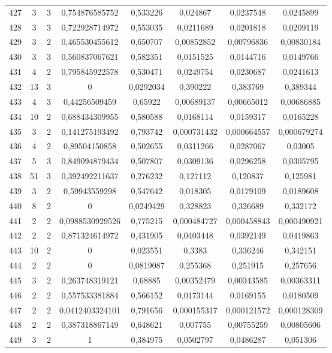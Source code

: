 \begin{longtable}{|c|c|c|c|c|c|c|c|}
427 & 3 & 3 & 0,754876585752 & 0,533226 & 0,024867 & 0,0237548 & 0,0245899  \\
428 & 3 & 3 & 0,722928714972 & 0,553035 & 0,0211689 & 0,0201818 & 0,0209119  \\
429 & 3 & 2 & 0,465530455612 & 0,650707 & 0,00852852 & 0,00796836 & 0,00830184  \\
430 & 3 & 3 & 0,560837067621 & 0,582351 & 0,0151525 & 0,0144716 & 0,0149766  \\
431 & 4 & 2 & 0,795845922578 & 0,530471 & 0,0249754 & 0,0230687 & 0,0241613  \\
432 & 13 & 3 & 0 & 0,0292034 & 0,390222 & 0,383769 & 0,389344  \\
433 & 4 & 3 & 0,44256509459 & 0,65922 & 0,00689137 & 0,00665012 & 0,00686885  \\
434 & 10 & 2 & 0,688434309955 & 0,580588 & 0,0168114 & 0,0159317 & 0,0165228  \\
435 & 3 & 2 & 0,141275193492 & 0,793742 & 0,000731432 & 0,000664557 & 0,000679274  \\
436 & 4 & 2 & 0,89504150858 & 0,502655 & 0,0311266 & 0,0287067 & 0,03005  \\
437 & 5 & 3 & 0,849094879434 & 0,507807 & 0,0309136 & 0,0296258 & 0,0305795  \\
438 & 51 & 3 & 0,392492211637 & 0,276232 & 0,127112 & 0,120837 & 0,125981  \\
439 & 3 & 2 & 0,59943559298 & 0,547642 & 0,018305 & 0,0179109 & 0,0189608  \\
440 & 8 & 2 & 0 & 0,0249429 & 0,328823 & 0,326689 & 0,332172  \\
441 & 2 & 2 & 0,0988530929526 & 0,775215 & 0,000484727 & 0,000458843 & 0,000490921  \\
442 & 2 & 2 & 0,871324614972 & 0,431905 & 0,0403448 & 0,0392149 & 0,0419863  \\
443 & 10 & 2 & 0 & 0,023551 & 0,3383 & 0,336246 & 0,342151  \\
444 & 2 & 2 & 0 & 0,0819087 & 0,255368 & 0,251915 & 0,257656  \\
445 & 3 & 2 & 0,263748319121 & 0,68885 & 0,00352479 & 0,00343585 & 0,00363311  \\
446 & 2 & 2 & 0,557533381884 & 0,566152 & 0,0173144 & 0,0169155 & 0,0180509  \\
447 & 2 & 2 & 0,0412403324101 & 0,791656 & 0,000155317 & 0,000121572 & 0,000128309  \\
448 & 2 & 2 & 0,387318867149 & 0,648621 & 0,007755 & 0,00755259 & 0,00805606  \\
449 & 3 & 2 & 1 & 0,384975 & 0,0502797 & 0,0486287 & 0,051306  \\

\end{longtable}
